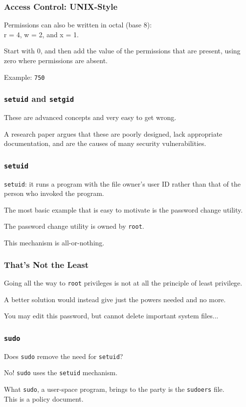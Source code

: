 \begin{frame}
	\frametitle{Access Control: UNIX-Style}


	Permissions can also be written in octal (base 8): \\
	\quad r = 4, w = 2, and x = 1.

	Start with 0, and then add the value of the  permissions that are present, using zero where permissions are absent.

	Example: \texttt{750} 


\end{frame}


\begin{frame}
\frametitle{\texttt{setuid} and \texttt{setgid}}

These are advanced concepts and very easy to get wrong.

A research paper argues that these are poorly designed, lack appropriate documentation, and are the causes of many security vulnerabilities.


\end{frame}


\begin{frame}
\frametitle{\texttt{setuid}}

\texttt{setuid}: it runs a program with the file owner's user ID rather than that of the person who invoked the program. 

The most basic example that is easy to motivate is the password change utility.

The password change utility is owned by \texttt{root}.

This mechanism is all-or-nothing.

\end{frame}


\begin{frame}
\frametitle{That's Not the Least}

Going all the way to \texttt{root} privileges is not at all the principle of least privilege.

A better solution would instead give just the powers needed and no more. 

You may edit this password, but cannot delete important system files...


\end{frame}


\begin{frame}
\frametitle{\texttt{sudo}}

Does \texttt{sudo} remove the need for \texttt{setuid}?

No! \texttt{sudo} uses the \texttt{setuid} mechanism.

What \texttt{sudo}, a user-space program, brings to the party is the \texttt{sudoers} file.\\
\quad This is a policy document.

\end{frame}


